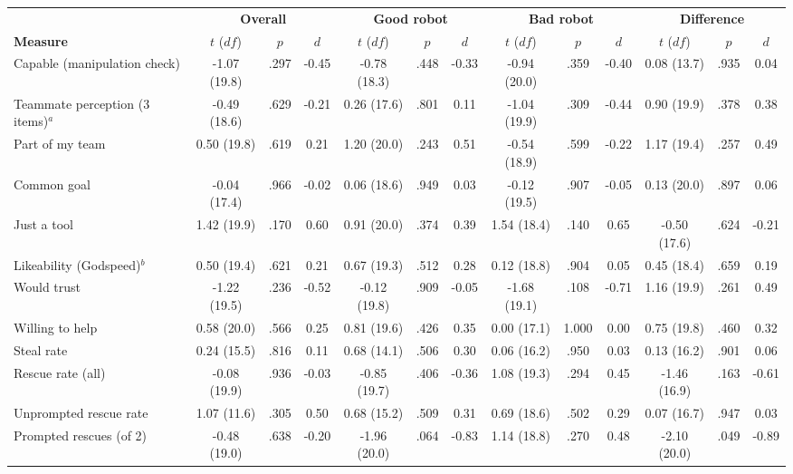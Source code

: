 \begin{table}[H]
\centering
\scriptsize
\setlength{\tabcolsep}{2.2pt}
\begin{tabular}{l|ccc|ccc|ccc|ccc}
\toprule
 & \multicolumn{3}{c|}{\textbf{Overall}} & \multicolumn{3}{c|}{\textbf{Good robot}} & \multicolumn{3}{c|}{\textbf{Bad robot}} & \multicolumn{3}{c}{\textbf{Difference}} \\
\textbf{Measure} & $t$ ($df$) & $p$ & $d$ & $t$ ($df$) & $p$ & $d$ & $t$ ($df$) & $p$ & $d$ & $t$ ($df$) & $p$ & $d$ \\
\midrule
Capable (manipulation check) & -1.07 (19.8) & .297 & -0.45 & -0.78 (18.3) & .448 & -0.33 & -0.94 (20.0) & .359 & -0.40 & 0.08 (13.7) & .935 & 0.04 \\
Teammate perception (3 items)$^{a}$ & -0.49 (18.6) & .629 & -0.21 & 0.26 (17.6) & .801 & 0.11 & -1.04 (19.9) & .309 & -0.44 & 0.90 (19.9) & .378 & 0.38 \\
\quad Part of my team & 0.50 (19.8) & .619 & 0.21 & 1.20 (20.0) & .243 & 0.51 & -0.54 (18.9) & .599 & -0.22 & 1.17 (19.4) & .257 & 0.49 \\
\quad Common goal & -0.04 (17.4) & .966 & -0.02 & 0.06 (18.6) & .949 & 0.03 & -0.12 (19.5) & .907 & -0.05 & 0.13 (20.0) & .897 & 0.06 \\
\quad Just a tool & 1.42 (19.9) & .170 & 0.60 & 0.91 (20.0) & .374 & 0.39 & 1.54 (18.4) & .140 & 0.65 & -0.50 (17.6) & .624 & -0.21 \\
Likeability (Godspeed)$^{b}$ & 0.50 (19.4) & .621 & 0.21 & 0.67 (19.3) & .512 & 0.28 & 0.12 (18.8) & .904 & 0.05 & 0.45 (18.4) & .659 & 0.19 \\
Would trust & -1.22 (19.5) & .236 & -0.52 & -0.12 (19.8) & .909 & -0.05 & -1.68 (19.1) & .108 & -0.71 & 1.16 (19.9) & .261 & 0.49 \\
Willing to help & 0.58 (20.0) & .566 & 0.25 & 0.81 (19.6) & .426 & 0.35 & 0.00 (17.1) & 1.000 & 0.00 & 0.75 (19.8) & .460 & 0.32 \\
Steal rate & 0.24 (15.5) & .816 & 0.11 & 0.68 (14.1) & .506 & 0.30 & 0.06 (16.2) & .950 & 0.03 & 0.13 (16.2) & .901 & 0.06 \\
Rescue rate (all) & -0.08 (19.9) & .936 & -0.03 & -0.85 (19.7) & .406 & -0.36 & 1.08 (19.3) & .294 & 0.45 & -1.46 (16.9) & .163 & -0.61 \\
Unprompted rescue rate & 1.07 (11.6) & .305 & 0.50 & 0.68 (15.2) & .509 & 0.31 & 0.69 (18.6) & .502 & 0.29 & 0.07 (16.7) & .947 & 0.03 \\
Prompted rescues (of 2) & -0.48 (19.0) & .638 & -0.20 & -1.96 (20.0) & .064 & -0.83 & 1.14 (18.8) & .270 & 0.48 & -2.10 (20.0) & .049 & -0.89 \\

\end{tabular}
\end{table}
